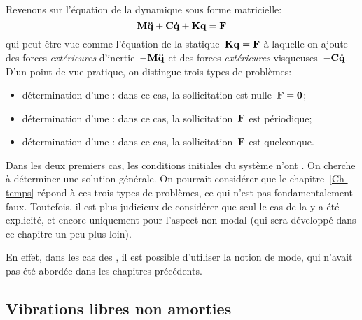 Revenons sur l'équation de la dynamique sous forme matricielle:
\begin{equation} \MM{M}\VV{\ddot{q}}+\MM{C}\VV{\dot{q}}+\MM{K}\VV{q}=\VV{F} \end{equation}
qui peut être vue comme l'équation de la statique~$\MM{K}\VV{q}=\VV{F}$ à laquelle on ajoute des forces \emph{extérieures} d'inertie~$-\MM{M}\VV{\ddot{q}}$ et des forces \emph{extérieures} visqueuses~$-\MM{C}\VV{\dot{q}}$.
\medskipvm
D'un point de vue pratique, on distingue trois types de problèmes:
\begin{itemize}
  \item détermination d'une :
	dans ce cas, la sollicitation est nulle~$\VV{F} = \VV{0}$;
  \item détermination d'une :
 	dans ce cas, la sollicitation~$\VV{F}$ est périodique;
  \item détermination d'une :
	dans ce cas, la sollicitation~$\VV{F}$ est quelconque.
\end{itemize}
Dans les deux premiers cas, les conditions initiales du système n'ont .
On cherche à déterminer une solution générale.
\medskipvm
On pourrait considérer que le chapitre~\ref{Ch-temps} répond à ces trois types de problèmes, ce qui n'est pas fondamentalement faux. Toutefois, il est plus judicieux de considérer que seul le cas de la  y a été explicité, et encore uniquement pour l'aspect non modal (qui sera développé dans ce chapitre un peu plus loin).

En effet, dans les cas des , il est possible d'utiliser la notion de mode, qui n'avait pas été abordée dans les chapitres précédents.


\medskip
\subsection{Vibrations libres non amorties}

